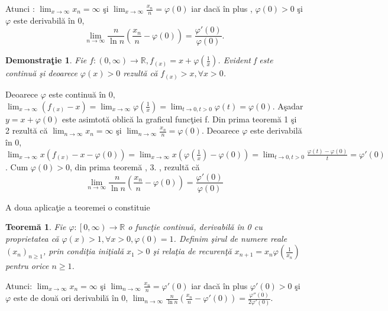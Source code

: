 \documentclass[a4paper,12pt,oneside]{report}
\newtheorem{demonstration}{Demonstra\c tie}
\newtheorem{theorem}{Teorem\u a}
\begin{document}
Atunci :
\(\lim_{x \to \infty } x_{n} = \infty\) \c si \(\lim_{x \to \infty }\frac{x_{n}}{n} = \varphi\left ( 0 \right )\) iar dac\u a \^ in plus , \(\varphi\left ( 0 \right )> 0\) \c si  \(\varphi\) este derivabil\u a \^ in 0, 
\begin{displaymath}
  \lim_{n \to \infty }\frac{n}{\ln n }\left ( \frac{x_{n}}{n} -\varphi \left ( 0 \right )\right ) = \frac{{\varphi }'\left ( 0 \right )}{\varphi \left ( 0 \right )}.
\end{displaymath}
 

\begin{demonstration}
  Fie \(f : \left ( 0,\infty  \right ) \to \mathbb{R}, f_{\left ( x \right )} = x+ \varphi \left ( \frac{1}{x} \right )\). Evident f este continu\u a \c si deoarece \(\varphi \left ( x \right )> 0\) rezult\u a c\u a \(f_{\left ( x \right )}> x, \forall x> 0 \). 
\end{demonstration}

Deoarece \(\varphi\) este continu\u a \^ in 0, \(\lim_{x \to \infty }\left ( f_{\left ( x \right ) }-x\right ) = \lim_{x \to \infty }\varphi \left ( \frac{1}{x} \right )  = \lim_{t \to 0, t> 0 }\varphi \left ( t \right ) = \varphi \left ( 0 \right )\). 
A\c sadar \(y= x+\varphi \left ( 0 \right )\) este asimtot\u a oblic\u a la graficul func\c tiei f. Din prima teorem\u a 1 \c si 2 rezult\u a c\u a \(\lim_{n \to \infty }x_{n} = \infty\) \c si \(\lim_{n \to \infty }\frac{x_{n}}{n} = \varphi \left ( 0 \right )\). Deoarece \(\varphi\) este derivabil\u a \^ in 0, \(\lim_{x \to \infty } x\left ( f_{\left ( x \right )}-x- \varphi \left ( 0 \right ) \right ) = \lim_{x \to \infty } x\left ( \varphi \left ( \frac{1}{x} \right ) -\varphi \left ( 0 \right )\right ) = \lim_{t \to 0, t> 0 } \frac{\varphi \left ( t \right )-\varphi \left ( 0 \right )}{t} = {\varphi }'\left ( 0 \right )\). Cum \(\varphi \left ( 0 \right )> 0\), din prima teorem\u a , 3. , rezult\u a c\u a 
\begin{displaymath}
  \lim_{n \to \infty }\frac{n}{\ln n } \left ( \frac{x_{n}}{n }- \varphi \left ( 0 \right ) \right )= \frac{{\varphi}'\left ( 0 \right )}{\varphi \left ( 0 \right )}
\end{displaymath}


A doua aplica\c tie a teoremei o constituie 

\begin{theorem}
  Fie \(\varphi : \left [ 0,\infty  \right ) \to \mathbb{R}\) o func\c tie continu\u a, derivabil\u a \^ in 0 cu proprietatea c\u a \(\varphi \left ( x \right )> 1, \forall x> 0, \varphi \left ( 0 \right ) = 1\). Definim \c sirul de numere reale \(\left ( x_{n} \right )_{n\geq 1}\), prin condi\c tia ini\c tial\u a \(x_{1}> 0\) \c si rela\c tia de recuren\c t\u a \(x_{n+1}= x_{n }\varphi\left ( \frac{1}{x_{n}} \right )\) pentru orice \(n\geq 1\). 
\end{theorem}
Atunci:
\(\lim_{x \to \infty }x_{n} = \infty\) \c si \(\lim_{n \to \infty }\frac{x_{n}}{n} = {\varphi }'\left ( 0 \right )\) iar dac\u a \^ in plus  \({\varphi }'\left ( 0 \right )> 0\) \c si \(\varphi\) este de dou\u a ori derivabil\u a \^ in 0, \(\lim_{n \to \infty }\frac{n}{\ln n}\left ( \frac{x_{n}}{n}-{\varphi }' \left ( 0 \right )\right )= \frac{{\varphi }''\left ( 0 \right )}{2{\varphi }'\left ( 0 \right )}\). 
\end{document}
